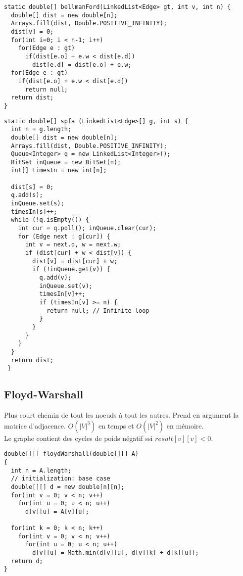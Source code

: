 \begin{lstlisting}
static double[] bellmanFord(LinkedList<Edge> gt, int v, int n) {
  double[] dist = new double[n];
  Arrays.fill(dist, Double.POSITIVE_INFINITY);
  dist[v] = 0;
  for(int i=0; i < n-1; i++)
    for(Edge e : gt)
      if(dist[e.o] + e.w < dist[e.d])
        dist[e.d] = dist[e.o] + e.w;
  for(Edge e : gt)
    if(dist[e.o] + e.w < dist[e.d])
      return null;
  return dist;
}
\end{lstlisting}
\begin{lstlisting}
static double[] spfa (LinkedList<Edge>[] g, int s) {
  int n = g.length;
  double[] dist = new double[n];
  Arrays.fill(dist, Double.POSITIVE_INFINITY);
  Queue<Integer> q = new LinkedList<Integer>();
  BitSet inQueue = new BitSet(n);
  int[] timesIn = new int[n];

  dist[s] = 0;
  q.add(s);
  inQueue.set(s);
  timesIn[s]++;
  while (!q.isEmpty()) {
    int cur = q.poll(); inQueue.clear(cur);
    for (Edge next : g[cur]) {
      int v = next.d, w = next.w;
      if (dist[cur] + w < dist[v]) {
        dist[v] = dist[cur] + w;
        if (!inQueue.get(v)) {
          q.add(v);
          inQueue.set(v);
          timesIn[v]++;
          if (timesIn[v] >= n) {
            return null; // Infinite loop
          }
        }
      }
    }
  }
  return dist;
 }
\end{lstlisting}
\subsection{Floyd-Warshall}
Plus court chemin de tout les noeuds à tout les autres. Prend en argument la matrice d'adjacence. $O(|V|^3)$ en temps et $O(|V|^2)$ en mémoire.\\
Le graphe contient des cycles de poids négatif ssi $result[v][v]<0$.\\

\begin{lstlisting}
double[][] floydWarshall(double[][] A)
{
  int n = A.length;
  // initialization: base case
  double[][] d = new double[n][n];
  for(int v = 0; v < n; v++)
    for(int u = 0; u < n; u++)
      d[v][u] = A[v][u];

  for(int k = 0; k < n; k++)
    for(int v = 0; v < n; v++)
      for(int u = 0; u < n; u++)
        d[v][u] = Math.min(d[v][u], d[v][k] + d[k][u]);
  return d;
}
\end{lstlisting}
